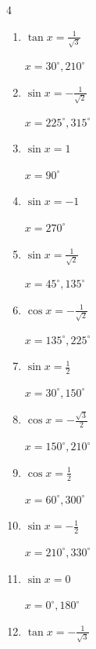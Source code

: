 \begin{multicols}{4}
\begin{enumerate}
        $\displaystyle x = 0^{\circ}$

  \item $\displaystyle \tan{x}  = \frac{1}{\sqrt{3}}$

        $\displaystyle x = 30^{\circ} , 210^{\circ}$

  \item $\displaystyle \sin{x}  = -\frac{1}{\sqrt{2}}$

        $\displaystyle x = 225^{\circ} , 315^{\circ}$

  \item $\displaystyle \sin{x}  = 1$

        $\displaystyle x = 90^{\circ}$

  \item $\displaystyle \sin{x}  = -1$

        $\displaystyle x = 270^{\circ}$

  \item $\displaystyle \sin{x}  = \frac{1}{\sqrt{2}}$

        $\displaystyle x = 45^{\circ} , 135^{\circ}$

  \item $\displaystyle \cos{x}  = -\frac{1}{\sqrt{2}}$

        $\displaystyle x = 135^{\circ} , 225^{\circ}$

  \item $\displaystyle \sin{x}  = \frac{1}{2}$

        $\displaystyle x = 30^{\circ} , 150^{\circ}$

  \item $\displaystyle \cos{x}  = -\frac{\sqrt{3}}{2}$

        $\displaystyle x = 150^{\circ} , 210^{\circ}$

  \item $\displaystyle \cos{x}  = \frac{1}{2}$

        $\displaystyle x = 60^{\circ} , 300^{\circ}$

  \item $\displaystyle \sin{x}  = -\frac{1}{2}$

        $\displaystyle x = 210^{\circ} , 330^{\circ}$

  \item $\displaystyle \sin{x}  = 0$

        $\displaystyle x = 0^{\circ} , 180^{\circ}$

  \item $\displaystyle \tan{x}  = -\frac{1}{\sqrt{3}}$


\end{enumerate}
\end{multicols}
